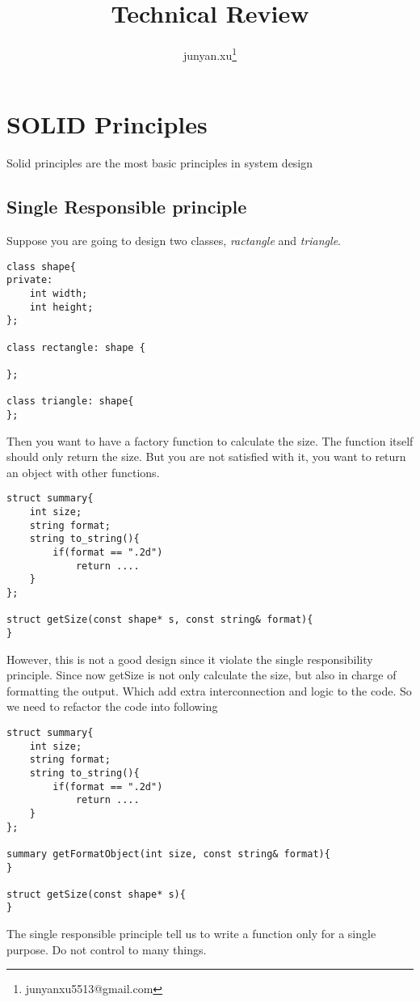 \documentclass[11pt, oneside]{article}   	%
\title{Technical Review}
\author{junyan.xu\footnote{junyanxu5513@gmail.com}}
\begin{document}
\maketitle

\tableofcontents

\newpage

\section{SOLID Principles}
Solid principles are the most basic principles in system design

\subsection{Single Responsible principle}
Suppose you are going to design two classes, \textit{ractangle} and \textit{triangle}.

\begin{lstlisting}
class shape{
private:
	int width;
	int height;
};

class rectangle: shape {

};

class triangle: shape{
};
\end{lstlisting}

Then you want to have a factory function to calculate the size. The function itself should only return the size. But you are not satisfied with it, you want to return an object with other functions.
\begin{lstlisting}
struct summary{
	int size;
	string format;
	string to_string(){
		if(format == ".2d")
			return ....
	}
};

struct getSize(const shape* s, const string& format){
}
\end{lstlisting}

However, this is not a good design since it violate the single responsibility principle. Since now getSize is not only calculate the size, but also in charge of formatting the output.
Which add extra interconnection and logic to the code. So we need to refactor the code into following
\begin{lstlisting}
struct summary{
	int size;
	string format;
	string to_string(){
		if(format == ".2d")
			return ....
	}
};

summary getFormatObject(int size, const string& format){
}

struct getSize(const shape* s){
}
\end{lstlisting}
The single responsible principle tell us to write a function only for a single purpose. Do not control to many things.
\end{document}
